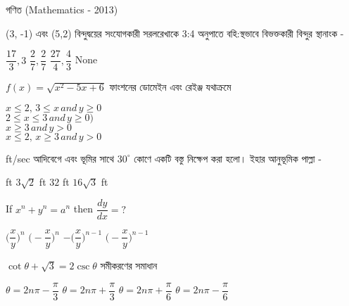 \documentclass[addpoints]{exam}
\begin{document}
\begin{LARGE}
\begin{center}
গণিত (Mathematics - 2013)
\end{center}
\end{LARGE}
\begin{questions}

\question  (3, -1) এবং (5,2) বিন্দুদ্বয়ের সংযোগকারী সরলরেখাকে 3:4 অনুপাতে বহি:স্থভাবে বিভক্তকারী বিন্দুর স্থানাংক -

\begin{oneparchoices}
\choice $ \dfrac{17}{3}, 3 $
\choice $ \dfrac{2}{7}, \dfrac{2}{7} $
\choice $ \dfrac{27}{4}, \dfrac{4}{3} $
\choice None
\end{oneparchoices}

 \question  $ f(x)= \sqrt{x^{2}-5x+6} $ ফাংশনের ডোমেইন এবং রেইঞ্জ যথাক্রমে

\begin{oneparchoices}
\choice $ x \le 2,\, 3 \le x \,and\, y \ge 0 $\\

\choice $ 2 \le x \le 3\, and\, y ≥ 0) $\\

\choice $ x \ge 3\, and\, y > 0  $\\

\choice $ x \le 2,\, x \ge 3\, and\, y > 0  $

\end{oneparchoices}

 ft/sec আদিবেগে এবং ভূমির সাথে $ 30^{\circ} $ কোণে একটি বস্তু নিক্ষেপ করা হলো। ইহার আনুভূমিক পাল্লা - 

\begin{oneparchoices}
 ft
\choice $ 3\sqrt{2} $ ft
\choice $ 32 $ ft
\choice  $ 16\sqrt{3} $ ft

\end{oneparchoices}

\question  If  $x^{n} +y^{n} = a^{n} $ then $ \dfrac{dy}{dx}=? $

\begin{oneparchoices}
\choice $ \Big( \dfrac{x}{y}\Big)^{n}$
\choice $ \Big( -\dfrac{x}{y}\Big)^{n}$
\choice $ -\Big( \dfrac{x}{y}\Big)^{n-1}$
\choice $ \Big(- \dfrac{x}{y}\Big)^{n-1}$

\end{oneparchoices}

\question  $\cot\theta + \sqrt{3} = 2\csc\theta $ সমীকরণের সমাধান

\begin{oneparchoices}
\choice $ \theta = 2n\pi -\dfrac{\pi}{3} $
\choice $ \theta = 2n\pi +\dfrac{\pi}{3} $
\choice $ \theta = 2n\pi +\dfrac{\pi}{6} $
\choice $ \theta = 2n\pi -\dfrac{\pi}{6} $


\end{oneparchoices}
\end{questions}
\end{document}
